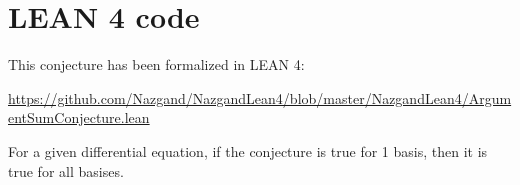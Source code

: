 \documentclass[]{article}
\numberwithin{equation}{section}
\begin{document}
	\section{LEAN 4 code}
		This conjecture has been formalized in LEAN 4:
		
		\href{https://github.com/Nazgand/NazgandLean4/blob/master/NazgandLean4/ArgumentSumConjecture.lean}{https://github.com/Nazgand/NazgandLean4/blob/master/NazgandLean4/ArgumentSumConjecture.lean}
		
		For a given differential equation, if the conjecture is true for 1 basis, then it is true for all basises.
\end{document}
